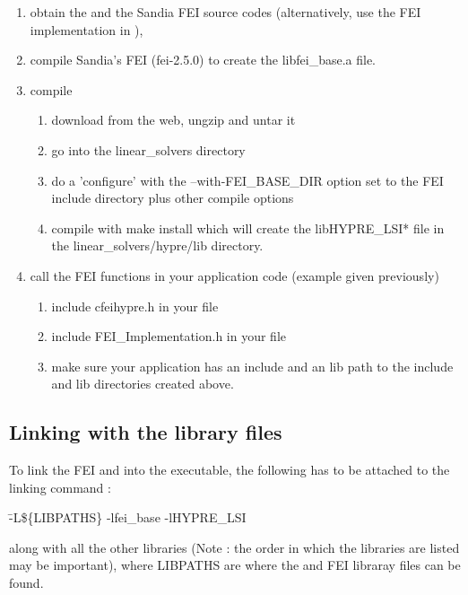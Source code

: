 \begin{enumerate}

\item obtain the \hypre{} and the Sandia FEI source codes (alternatively, use
      the {\sf FEI} implementation in \hypre{}),
\item compile Sandia's {\sf FEI} (fei-2.5.0) to create the
      {\sf libfei\_base.a} file.
\item compile \hypre{} 
\begin{enumerate}
\item download \hypre{} from the web, ungzip and untar it
\item go into the {\sf linear\_solvers} directory
\item do a 'configure' with the {\sf --with-FEI\_BASE\_DIR} option set to
      the {\sf FEI} include directory plus other compile options
\item compile with {\sf make install} which will create the
      {\sf libHYPRE\_LSI*} file in the {\sf linear\_solvers/hypre/lib}
      directory.
\end{enumerate}
\item call the {\sf FEI} functions in your application code (example given
      previously)
\begin{enumerate}
\item include {\sf cfei\-hypre.h} in your file 
\item include {\sf FEI\_Implementation.h} in your file 
\item make sure your application has an {\sf include} and an {\sf lib} path 
      to the {\sf include} and {\sf lib} directories created above. 
\end{enumerate}

\end{enumerate}

\subsection{Linking with the library files}

To link the {\sf FEI} and \hypre{} into the executable, the following has to be
attached to the linking command :

\begin{tabbing}
\hspace{0.5in} \= {\sf -L\$\{LIBPATHS\} -lfei\_base -lHYPRE\_LSI} 
\end{tabbing}
along with all the other libraries (Note : the order in which the libraries are
listed may be important), where {\sf LIBPATHS} are where 
the \hypre{} and {\sf FEI} libraray files can be found.  


